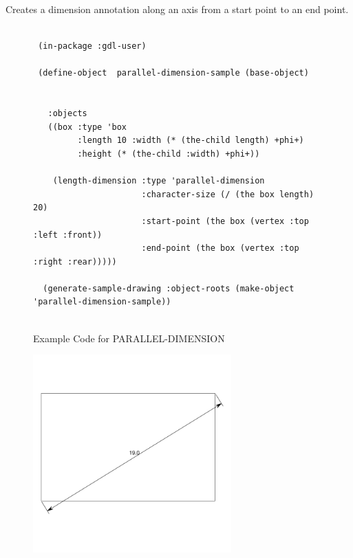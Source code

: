 \documentclass [11pt]{book}
\begin{document}
\begin{itemize}
\begin{description}
Creates a dimension annotation along an axis from a start point to an end point.



\end{description}




\begin{figure}
\begin{lrbox}{\boxedverb}
\begin{minipage}{\linewidth}
{\small

\begin{verbatim}        

 (in-package :gdl-user)
                   
 (define-object  parallel-dimension-sample (base-object)
  
  
   :objects
   ((box :type 'box
         :length 10 :width (* (the-child length) +phi+)
         :height (* (the-child :width) +phi+))
   
    (length-dimension :type 'parallel-dimension
                      :character-size (/ (the box length) 20)
                      :start-point (the box (vertex :top :left :front))
                      :end-point (the box (vertex :top :right :rear)))))

  (generate-sample-drawing :object-roots (make-object 'parallel-dimension-sample))


\end{verbatim}}
\end{minipage}
\end{lrbox}
\fbox{\usebox{\boxedverb}}

\caption{Example Code for PARALLEL-DIMENSION}

\label{fig:example-code-PARALLEL-DIMENSION}

\end{figure}

\begin{figure}
\begin{center}
\includegraphics[width=3in,height=3in]{../images/example-parallel-dimension.pdf}
\end{center}


\end{figure}
\end{itemize}
\end{document}

